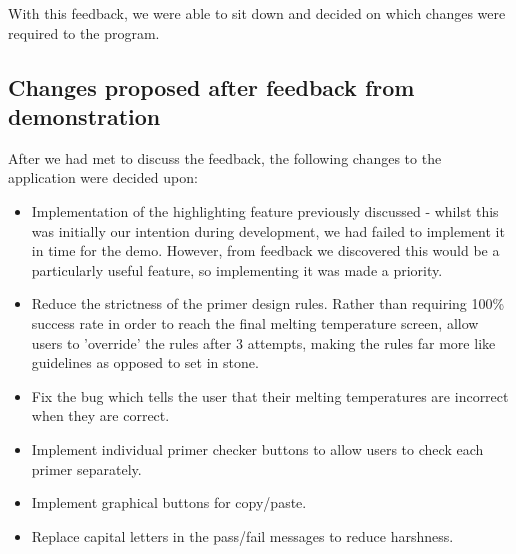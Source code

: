 With this feedback, we were able to sit down and decided on which changes were required to the program.

\subsection{Changes proposed after feedback from demonstration} 

After we had met to discuss the feedback, the following changes to the application were decided upon:

\begin{itemize}

\item Implementation of the highlighting feature previously discussed - whilst this was initially our intention during development, we had failed to implement it in time for the demo. However, from feedback we discovered this would be a particularly useful feature, so implementing it was made a priority.
\item Reduce the strictness of the primer design rules. Rather than requiring 100\% success rate in order to reach the final melting temperature screen, allow users to 'override' the rules after 3 attempts, making the rules far more like guidelines as opposed to set in stone.
\item Fix the bug which tells the user that their melting temperatures are incorrect when they are correct.
\item Implement individual primer checker buttons to allow users to check each primer separately.
\item Implement graphical buttons for copy/paste.
\item Replace capital letters in the pass/fail messages to reduce harshness.

\end{itemize}
